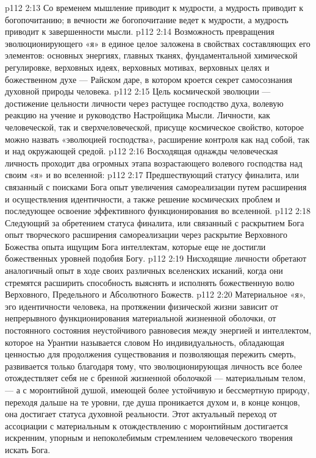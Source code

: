 \vs p112 2:13 Со временем мышление приводит к мудрости, а мудрость приводит к богопочитанию; в вечности же богопочитание ведет к мудрости, а мудрость приводит к завершенности мысли.
\vs p112 2:14 Возможность превращения эволюционирующего «я» в единое целое заложена в свойствах составляющих его элементов: основных энергиях, главных тканях, фундаментальной химической регулировке, верховных идеях, верховных мотивах, верховных целях и божественном духе --- Райском даре, в котором кроется секрет самосознания духовной природы человека.
\vs p112 2:15 Цель космической эволюции --- достижение цельности личности через растущее господство духа, волевую реакцию на учение и руководство Настройщика Мысли. Личности, как человеческой, так и сверхчеловеческой, присуще космическое свойство, которое можно назвать «эволюцией господства», расширение контроля как над собой, так и над окружающей средой.
\vs p112 2:16 \pc Восходящая однажды человеческая личность проходит два огромных этапа возрастающего волевого господства над своим «я» и во вселенной:
\vs p112 2:17 \bibnobreakspace Предшествующий статусу финалита, или связанный с поисками Бога опыт увеличения самореализации путем расширения и осуществления идентичности, а также решение космических проблем и последующее освоение эффективного функционирования во вселенной.
\vs p112 2:18 \bibnobreakspace Следующий за обретением статуса финалита, или связанный с раскрытием Бога опыт творческого расширения самореализации через раскрытие Верховного Божества опыта ищущим Бога интеллектам, которые еще не достигли божественных уровней подобия Богу.
\vs p112 2:19 \pc Нисходящие личности обретают аналогичный опыт в ходе своих различных вселенских исканий, когда они стремятся расширить способность выяснять и исполнять божественную волю Верховного, Предельного и Абсолютного Божеств.
\vs p112 2:20 \pc Материальное «я», эго идентичности человека, на протяжении физической жизни зависит от непрерывного функционирования материальной жизненной оболочки, от постоянного состояния неустойчивого равновесия между энергией и интеллектом, которое на Урантии называется словом  Но индивидуальность, обладающая ценностью для продолжения существования и позволяющая пережить смерть, развивается только благодаря тому, что эволюционирующая личность все более отождествляет себя не с бренной жизненной оболочкой --- материальным телом, --- а с моронтийной душой, имеющей более устойчивую и бессмертную природу, переходя дальше на те уровни, где душа проникается духом и, в конце концов, она достигает статуса духовной реальности. Этот актуальный переход от ассоциации с материальным к отождествлению с моронтийным достигается искренним, упорным и непоколебимым стремлением человеческого творения искать Бога.
